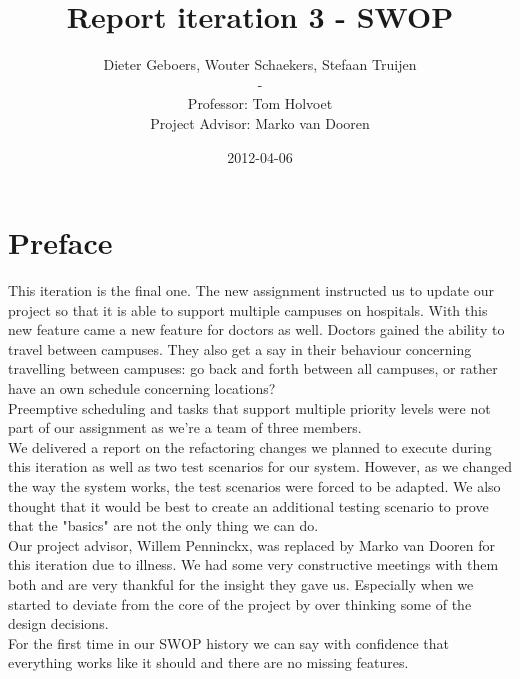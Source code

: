\documentclass[12pt]{article}
\title{Report iteration 3 - SWOP}
\author{Dieter Geboers, Wouter Schaekers, Stefaan Truijen\\ - \\ Professor: Tom Holvoet \\ Project Advisor: Marko van Dooren}
\date{2012-04-06}
\begin{document}
\maketitle

\section{Preface}
This iteration is the final one. The new assignment instructed us to update our project so that it is able to support multiple campuses on hospitals. With this new feature came a new feature for doctors as well. Doctors gained the ability to travel between campuses. They also get a say in their behaviour concerning travelling between campuses: go back and forth between all campuses, or rather have an own schedule concerning locations? \\
\newline Preemptive scheduling and tasks that support multiple priority levels were not part of our assignment as we're a team of three members. \\
\newline We delivered a report on the refactoring changes we planned to execute during this iteration as well as two test scenarios for our system. However, as we changed the way the system works, the test scenarios were forced to be adapted. We also thought that it would be best to create an additional testing scenario to prove that the "basics" are not the only thing we can do. \\
\newline Our project advisor, Willem Penninckx, was replaced by Marko van Dooren for this iteration due to illness. We had some very constructive meetings with them both and are very thankful for the insight they gave us. Especially when we started to deviate from the core of the  project by over thinking some of the design decisions.\\
\newline For the first time in our SWOP history we can say with confidence that everything works like it should and there are no missing features.

\pagebreak
\tableofcontents
\pagebreak
\end{document}
